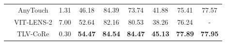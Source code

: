 \documentclass[letterpaper]{article} %
\theoremstyle{definition}                %
\theoremstyle{plain}                     %
\theoremstyle{remark}                    %
\begin{document}
\begin{table}[ht!]
\begin{tabular}{@{}c|c|c|ccc|c|c|
c@{}}
                               & AnyTouch    &   1.31         &   {\cellcolor[HTML]{E2F0D9}46.18}       &      {\cellcolor[HTML]{E2F0D9}84.39}         &    {\cellcolor[HTML]{E2F0D9}73.74}      &         {\cellcolor[HTML]{E2F0D9}41.88}     &       {\cellcolor[HTML]{E2F0D9}75.41}     &  \multicolumn{1}{c}{{\cellcolor[HTML]{E2F0D9}77.57}}                       \\
                               & VIT-LENS-2   &  7.00         &   {\cellcolor[HTML]{E2F0D9}52.64}       &    {\cellcolor[HTML]{E2F0D9}82.16}          &  {\cellcolor[HTML]{E2F0D9}80.53}        &    {\cellcolor[HTML]{E2F0D9}38.26}                               &    {\cellcolor[HTML]{E2F0D9}76.24} & \multicolumn{1}{c}{{\cellcolor[HTML]{E2F0D9}-}}                               \\
                               & TLV-CoRe     &  0.30         &  {\cellcolor[HTML]{E2F0D9}\textbf{54.47}}        &           {\cellcolor[HTML]{E2F0D9}\textbf{84.54}}   &    {\cellcolor[HTML]{E2F0D9}\textbf{84.47}}      &     {\cellcolor[HTML]{E2F0D9}\textbf{45.13}}                              &  {\cellcolor[HTML]{E2F0D9}\textbf{77.89}}             & \multicolumn{1}{c}{{\cellcolor[HTML]{E2F0D9}\textbf{77.95}}}                    \\ \midrule


\end{tabular}
\end{table}
\end{document}
